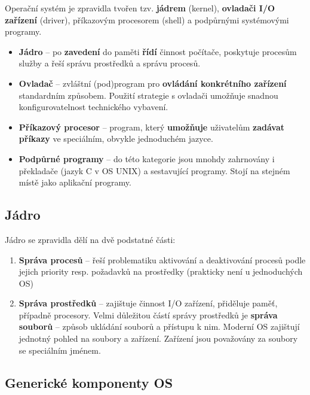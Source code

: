 Operační systém je zpravidla tvořen tzv. \textbf{jádrem} (kernel), \textbf{ovladači I/O zařízení} (driver), příkazovým procesorem (shell) a podpůrnými systémovými programy.
\begin{itemize}
	\item \textbf{Jádro} -- po \textbf{zavedení} do paměti \textbf{řídí} činnost počítače, poskytuje procesům služby a řeší správu prostředků a správu procesů.
	\item \textbf{Ovladač} -- zvláštní (pod)program pro \textbf{ovládání konkrétního zařízení} standardním způsobem. Použití strategie s ovladači umožňuje snadnou konfigurovatelnost technického vybavení.
	\item \textbf{Příkazový procesor} -- program, který \textbf{umožňuje} uživatelům \textbf{zadávat příkazy} ve speciálním, obvykle jednoduchém jazyce.
	\item \textbf{Podpůrné programy} -- do této kategorie jsou mnohdy zahrnovány i překladače (jazyk C v OS UNIX) a sestavující programy. Stojí na stejném místě jako aplikační programy.
\end{itemize}

\subsection{Jádro}
Jádro se zpravidla dělí na dvě podstatné části:
\begin{enumerate}
	\item \textbf{Správa procesů} -- řeší problematiku aktivování a deaktivování procesů podle jejich priority resp. požadavků na prostředky (prakticky není u jednoduchých OS)
	\item \textbf{Správa prostředků} -- zajištuje činnost I/O zařízení, přiděluje paměť, případně procesory. Velmi důležitou částí správy prostředků je \textbf{správa souborů} -- způsob ukládání souborů a přístupu k nim. Moderní OS zajištují jednotný pohled na soubory a zařízení. Zařízení jsou považovány za soubory se speciálním jménem.
\end{enumerate}

\subsection{Generické komponenty OS} %

